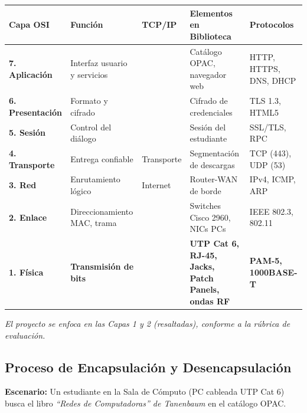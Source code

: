 \documentclass[12pt,a4paper]{article}
\begin{document}
\begin{tabularx}{\textwidth}{>{\centering\bfseries\small}p{1.4cm}>{\small}p{2cm}>{\small}p{1.8cm}>{\small}p{3.1cm}>{\small}X}
  \toprule
  \rowcolor{colorPrincipal}
  \color{white}Capa OSI&\color{white}Función&\color{white}TCP/IP&\color{white}Elementos en Biblioteca&\color{white}Protocolos\\
  \midrule
  7. Aplicación & Interfaz usuario y servicios & \multirow{3}{*}{Aplicación} & Catálogo OPAC, navegador web & HTTP, HTTPS, DNS, DHCP \\
  6. Presentación & Formato y cifrado & & Cifrado de credenciales & TLS 1.3, HTML5 \\
  5. Sesión & Control del diálogo & & Sesión del estudiante & SSL/TLS, RPC \\
  4. Transporte & Entrega confiable & Transporte & Segmentación de descargas & TCP (443), UDP (53) \\
  3. Red & Enrutamiento lógico & Internet & Router-WAN de borde & IPv4, ICMP, ARP \\
  2. Enlace & Direccionamiento MAC, trama & \multirow{2}{*}{Acceso Red} & Switches Cisco 2960, NICs PCs & IEEE 802.3, 802.11 \\
  \rowcolor{colorAcento!10}\textbf{1. Física} & \textbf{Transmisión de bits} & & \textbf{UTP Cat 6, RJ-45, Jacks, Patch Panels, ondas RF} & \textbf{PAM-5, 1000BASE-T} \\
  \bottomrule
\end{tabularx}
\begin{center}\small\itshape
El proyecto se enfoca en las Capas 1 y 2 (resaltadas), conforme a la rúbrica de evaluación.
\end{center}

\subsection{Proceso de Encapsulación y Desencapsulación}
\textbf{Escenario:} Un estudiante en la Sala de Cómputo (PC cableada UTP Cat 6) busca el libro \textit{``Redes de Computadoras'' de Tanenbaum} en el catálogo OPAC.
\end{document}

